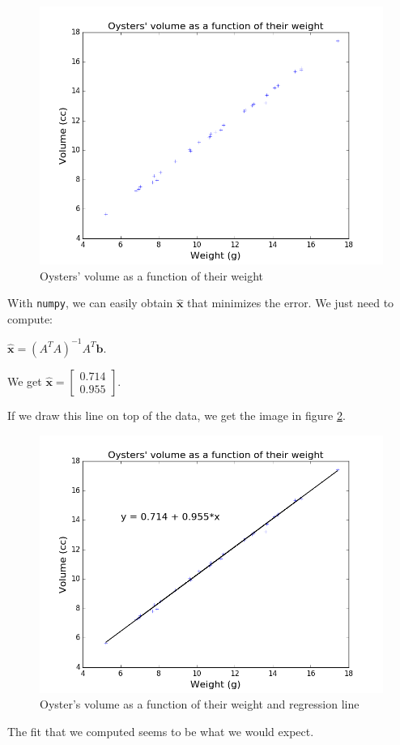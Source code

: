 \documentclass[]{article}
\begin{document}
\begin{figure}[h]
\centering
\includegraphics{30oysters_plain.png}
\caption{Oysters' volume as a function of their weight}
\label{30oysters_plain}
\end{figure}

With \texttt{numpy}, we can easily obtain $\widehat{\textbf{x}}$ that minimizes the error. We just need to compute:

$\widehat{\textbf{x}} = (A^TA)^{-1}A^T\textbf{b}$.

We get $\widehat{\textbf{x}} = \left[\begin{smallmatrix}0.714\\0.955\end{smallmatrix}\right]$.

If we draw this line on top of the data, we get the image in figure \ref{30oysters_reg}.

\begin{figure}[h]
\centering
\includegraphics{30oysters_reg.png}
\caption{Oyster's volume as a function of their weight and regression line}
\label{30oysters_reg}
\end{figure}

The fit that we computed seems to be what we would expect.
\end{document}
